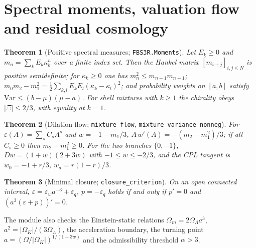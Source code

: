 \documentclass[11pt]{article}
\newtheorem{theorem}{Theorem}[section]
\theoremstyle{remark}
\newcommand{\lean}[1]{\texttt{#1}}
\begin{document}
\section{Spectral moments, valuation flow and residual cosmology}
\begin{theorem}[Positive spectral measures; \lean{FBS3R.Moments}]
Let $E_k\ge0$ and $m_n=\sum_kE_k\kappa_k^n$ over a finite index set. Then the Hankel matrix
$[m_{i+j}]_{i,j\le N}$ is positive semidefinite; for $\kappa_k\ge0$ one has
$m_n^2\le m_{n-1}m_{n+1}$; $m_0m_2-m_1^2=\tfrac12\sum_{k,l}E_kE_l(\kappa_k-\kappa_l)^2$; and
probability weights on $[a,b]$ satisfy $\mathrm{Var}\le(b-\mu)(\mu-a)$. For shell
mixtures with $k\ge1$ the chirality obeys $|\Xi|\le2/3$, with equality at $k=1$.
\end{theorem}
\begin{theorem}[Dilation flow; \lean{mixture\_flow}, \lean{mixture\_variance\_nonneg}]
For $\varepsilon(A)=\sum_sC_sA^s$ and $w=-1-m_1/3$, $A\,w'(A)=-(m_2-m_1^2)/3$; if all
$C_s\ge0$ then $m_2-m_1^2\ge0$. For the two branches $\{0,-1\}$,
$Dw=(1+w)(2+3w)$ with $-1\le w\le-2/3$, and the CPL tangent is $w_0=-1+r/3$,
$w_a=r(1-r)/3$.
\end{theorem}
\begin{theorem}[Minimal closure; \lean{closure\_criterion}]
On an open connected interval, $\varepsilon=\varepsilon_wa^{-3}+\varepsilon_q$,
$p=-\varepsilon_q$ holds if and only if $p'=0$ and $(a^3(\varepsilon+p))'=0$.
\end{theorem}
The module also checks the Einstein-static relations $\Omega_m=2\Omega_\Lambda a^3$,
$a^2=|\Omega_K|/(3\Omega_\Lambda)$, the acceleration boundary, the turning point
$a=(\Omega/|\Omega_K|)^{1/(1+3w)}$ and the admissibility threshold $\alpha>3$.
\end{document}
